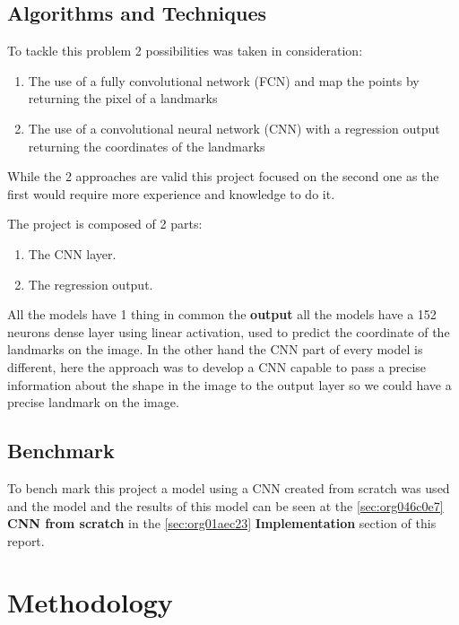 \documentclass[11pt]{article}
\begin{document}
\subsection{Algorithms and Techniques}
\label{sec:org3a05739}

To tackle this problem 2 possibilities was taken in consideration:

\begin{enumerate}
\item The use of a fully convolutional network (FCN) and map the points by
returning the pixel of a landmarks
\item The use of a convolutional neural network (CNN) with a regression output
returning the coordinates of the landmarks
\end{enumerate}

While the 2 approaches are valid this project focused on the second one as
the first would require more experience and knowledge to do it.

The project is composed of 2 parts:
\begin{enumerate}
\item The CNN layer.
\item The regression output.
\end{enumerate}

All the models have 1 thing in common the \textbf{output} all the models have a
152 neurons dense layer using linear activation, used to predict the
coordinate of the landmarks on the image.
In the other hand the CNN part of every model is different, here the approach
was to develop a CNN capable to pass a precise information about the shape in
the image to the output layer so we could have a precise landmark on the
image. 


\subsection{Benchmark}
\label{sec:orgbe13fba}

To bench mark this project a model using a CNN created from scratch was used 
and the model and the results of this model can be seen at the \ref{sec:org046c0e7} \textbf{CNN from scratch} in the \ref{sec:org01aec23} \textbf{Implementation} section of
this report.  


\section{Methodology}
\label{sec:orgf42334f}
\end{document}

